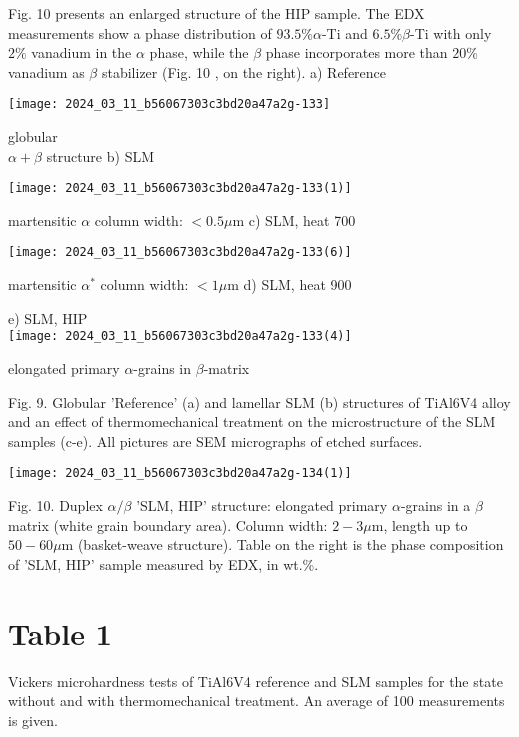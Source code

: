 \documentclass[10pt]{article}
\begin{document}
Fig. 10 presents an enlarged structure of the HIP sample. The EDX measurements show a phase distribution of $93.5 \% \alpha$-Ti and $6.5 \% \beta$-Ti with only $2 \%$ vanadium in the $\alpha$ phase, while the $\beta$ phase incorporates more than $20 \%$ vanadium as $\beta$ stabilizer (Fig. 10 , on the right). a) Reference

\begin{center}
\texttt{[image: 2024\_03\_11\_b56067303c3bd20a47a2g-133]}
\end{center}

globular\\
$\alpha+\beta$ structure b) SLM

\begin{center}
\texttt{[image: 2024\_03\_11\_b56067303c3bd20a47a2g-133(1)]}
\end{center}

martensitic $\alpha$ column width: $<0.5 \mu \mathrm{m}$ c) SLM, heat 700

\begin{center}
\texttt{[image: 2024\_03\_11\_b56067303c3bd20a47a2g-133(6)]}
\end{center}

martensitic $\alpha^{*}$ column width: $<1 \mu \mathrm{m}$ d) SLM, heat 900

e) SLM, HIP\\
\texttt{[image: 2024\_03\_11\_b56067303c3bd20a47a2g-133(4)]}

elongated primary $\alpha$-grains in $\beta$-matrix

Fig. 9. Globular 'Reference' (a) and lamellar SLM (b) structures of TiAl6V4 alloy and an effect of thermomechanical treatment on the microstructure of the SLM samples (c-e). All pictures are SEM micrographs of etched surfaces.

\begin{center}
\texttt{[image: 2024\_03\_11\_b56067303c3bd20a47a2g-134(1)]}
\end{center}

Fig. 10. Duplex $\alpha / \beta$ 'SLM, HIP' structure: elongated primary $\alpha$-grains in a $\beta$ matrix (white grain boundary area). Column width: $2-3 \mu \mathrm{m}$, length up to $50-60 \mu \mathrm{m}$ (basket-weave structure). Table on the right is the phase composition of 'SLM, HIP' sample measured by EDX, in wt.\%.

\section*{Table 1}
Vickers microhardness tests of TiAl6V4 reference and SLM samples for the state without and with thermomechanical treatment. An average of 100 measurements is given.
\end{document}
